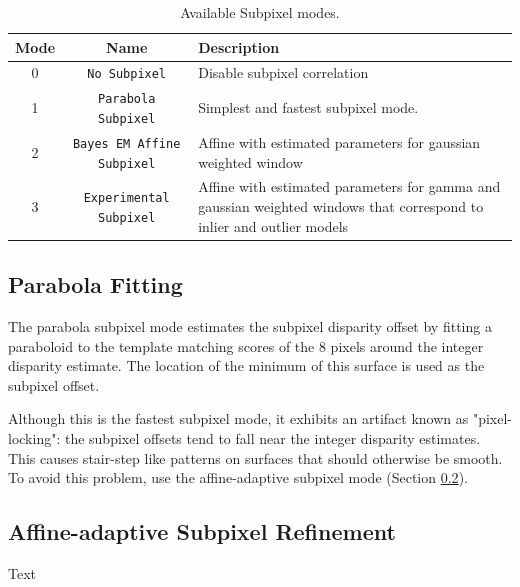 \begin{table}[htb]\begin{centering}
\begin{tabular}{|c|c|p{3.5 in}|} \hline
Mode & Name & Description \\ \hline \hline
0 & \verb#No Subpixel# & Disable subpixel correlation \\ \hline
1 & \verb#Parabola Subpixel# & Simplest and fastest subpixel mode. \\ \hline
2 & \verb#Bayes EM Affine Subpixel# & Affine with estimated parameters for gaussian weighted window\\ \hline
3 & \verb#Experimental Subpixel# & Affine with estimated parameters for gamma and gaussian weighted windows that correspond to inlier and outlier models\\ \hline
\end{tabular}
\caption{Available Subpixel modes.}
\label{tbl:subpixel-modes}
\end{centering}\end{table}

\subsection{Parabola Fitting}
\label{sec:parabola_subpixel}
The parabola subpixel mode estimates the subpixel disparity offset by fitting
a paraboloid to the template matching scores of the 8 pixels around the integer
disparity estimate.  The location of the minimum of this surface is used as the
subpixel offset.

Although this is the fastest subpixel mode, it exhibits an artifact known as "pixel-locking":
the subpixel offsets tend to fall near the integer disparity estimates. This causes stair-step
like patterns on surfaces that should otherwise be smooth. To avoid this problem, use
the affine-adaptive subpixel mode (Section \ref{sec:affine_subpixel}).

\subsection{Affine-adaptive Subpixel Refinement}
\label{sec:affine_subpixel}

Text

